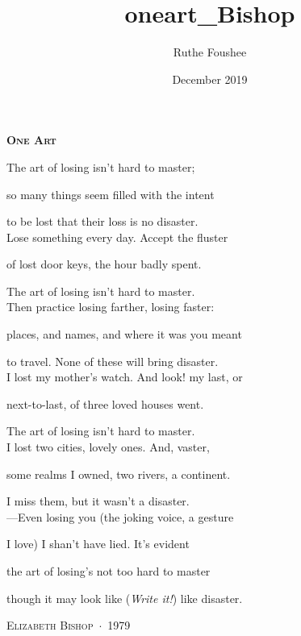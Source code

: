 \documentclass[14pt]{memoir}
\title{oneart_Bishop}
\author{Ruthe Foushee}
\date{December 2019}
\begin{document}
\thispagestyle{empty}
\textbf{\textsc{\large One Art}}
\vspace{28pt}

The art of losing isn't hard to master;

so many things seem filled with the intent

to be lost that their loss is no disaster.\\


Lose something every day. Accept the fluster

of lost door keys, the hour badly spent.

The art of losing isn't hard to master.\\


Then practice losing farther, losing faster:

places, and names, and where it was you meant

to travel. None of these will bring disaster.\\


I lost my mother's watch. And look! my last, or

next-to-last, of three loved houses went.

The art of losing isn't hard to master.\\


I lost two cities, lovely ones. And, vaster,

some realms I owned, two rivers, a continent.

I miss them, but it wasn't a disaster.\\


---Even losing you (the joking voice, a gesture

I love) I shan't have lied. It's evident

the art of losing's not too hard to master

though it may look like (\textit{Write it!}) like disaster.

\vspace{42pt}
\hspace{60pt} \textsc{Elizabeth Bishop}~$\cdot$~1979

\vfill
\end{document}
